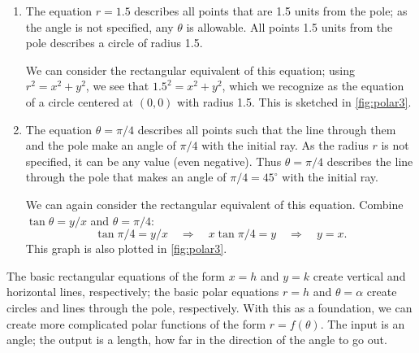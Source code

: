 {\begin{enumerate}
\item		The equation $r=1.5$ describes all points that are 1.5 units from the pole; as the angle is not specified, any $\theta$ is allowable. All points 1.5 units from the pole describes a circle of radius 1.5.

We can consider the rectangular equivalent of this equation; using $r^2=x^2+y^2$, we see that $1.5^2=x^2+y^2$, which we recognize as the equation of a circle centered at $(0,0)$ with radius 1.5. This is sketched in \autoref{fig:polar3}.


\item		The equation $\theta = \pi/4$ describes all points such that the line through them and the pole make an angle of $\pi/4$ with the initial ray. As the radius $r$ is not specified, it can be any value (even negative). Thus $\theta = \pi/4$ describes the line through the pole that makes an angle of $\pi/4 = 45^\circ$ with the initial ray.

We can again consider the rectangular equivalent of this equation. Combine $\tan \theta =y/x$ and $\theta =\pi/4$:
$$\tan \pi/4 = y/x \quad \Rightarrow \quad x\tan \pi/4 = y \quad \Rightarrow \quad y = x.$$ 
This graph is also plotted in \autoref{fig:polar3}.\eoehere
\end{enumerate}}

The basic rectangular equations of the form $x=h$ and $y=k$ create vertical and horizontal lines, respectively; the basic polar equations $r= h$ and $\theta =\alpha$ create circles and lines through the pole, respectively. With this as a foundation, we can create more complicated polar functions of the form $r=f(\theta)$. The input is an angle; the output is a length, how far in the direction of the angle to go out.

